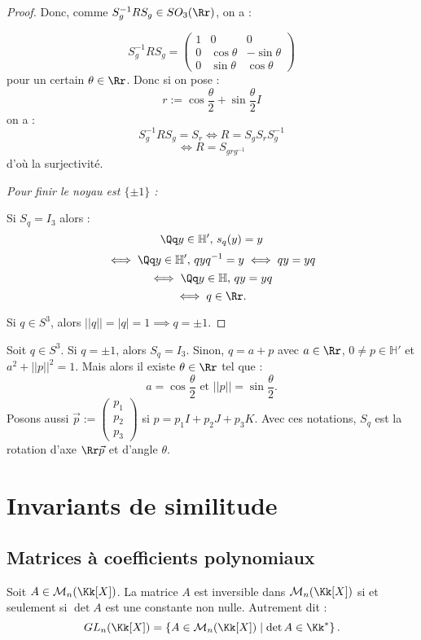 \documentclass[class=report,crop=false]{standalone}
\newcommand{\GL}{GL}
\newcommand{\Hh}{\mathbb{H}}
\begin{document}
\begin{proof}
Donc, comme $S_g^{-1} RS_g \in SO_3(\Rr)$, on a :

\[S_g^{-1} R S_g = \left(\begin{array}{ccc}
1&0&0\\
0& \cos \theta & -\sin\theta\\
0 & \sin \theta & \cos \theta
\end{array}\right)\] 
pour un certain $\theta \in \Rr$. Donc si on pose :
\[r:= \cos \frac{\theta}{2} + \sin  \frac{\theta}{2} I\]
on a :
\[S_g^{-1} R S_g = S_r \iff R = S_gS_rS_g^{-1}\]
\[\iff R = S_{grg^{-1}}\]
d'où la surjectivité.

{\it Pour finir le noyau est $\{\pm 1\}$ :}

Si $S_q = I_3$ alors : 
\[\Qq y \in \Hh',\, s_q(y) = y\]
\[\iff \Qq y \in \Hh',\, qyq^{-1} = y \iff qy = yq\]
\[\iff \Qq y \in \Hh,\, qy = yq\]
\[\iff q \in \Rr.\]

Si $q \in S^3$, alors $||q|| = |q| = 1 \implies q = \pm 1$.



\end{proof}

\begin{exercicecours}
Soit $q \in S^3$. Si $q=\pm 1$, alors $S_q= I_3$. Sinon, $q= a+p$ avec $a \in \Rr$, $0 \neq p \in \Hh'$ et $a^2 + ||p||^2=1$. Mais alors il existe $\theta \in \Rr$ tel que :
\[a = \cos \frac{\theta}{2} \text{ et } ||p|| = \sin \frac{\theta}{2} .\]
Posons aussi $\vec{p}:=\left(\begin{array}{c}
p_1\\
p_2\\
p_3
\end{array}\right)$ si $p = p_1I+p_2J+p_3K$.
Avec ces notations, $S_q$ est la rotation d'axe $\Rr \vec{p}$ et d'angle $\theta$.
\end{exercicecours}

\chapter{Invariants de similitude}

\section{Matrices à coefficients polynomiaux}

\begin{lemme}
Soit $A \in \mathcal{M}_n(\Kk[X])$. La matrice $A$ est inversible dans $\mathcal{M}_n(\Kk[X])$ si et seulement si $\det A$ est une constante non nulle. Autrement dit :
\[\GL_n(\Kk[X]) = \left\{ A \in \mathcal{M}_n(\Kk[X]) \mid \det A \in \Kk^*\right\}.\]
\end{lemme}
\end{document}
